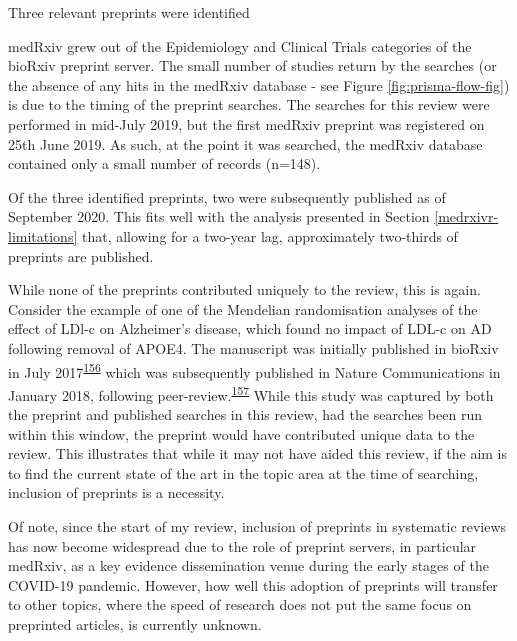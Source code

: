 \documentclass[a4paper, twoside]{templates/ociamthesis}
\begin{document}
Three relevant preprints were identified

medRxiv grew out of the Epidemiology and Clinical Trials categories of the bioRxiv preprint server. The small number of studies return by the searches (or the absence of any hits in the medRxiv database - see Figure \ref{fig:prisma-flow-fig}) is due to the timing of the preprint searches. The searches for this review were performed in mid-July 2019, but the first medRxiv preprint was registered on 25th June 2019. As such, at the point it was searched, the medRxiv database contained only a small number of records (n=148).

Of the three identified preprints, two were subsequently published as of September 2020. This fits well with the analysis presented in Section \ref{medrxivr-limitations} that, allowing for a two-year lag, approximately two-thirds of preprints are published.

While none of the preprints contributed uniquely to the review, this is again. Consider the example of one of the Mendelian randomisation analyses of the effect of LDl-c on Alzheimer's disease, which found no impact of LDL-c on AD following removal of APOE4. The manuscript was initially published in bioRxiv in July 2017\textsuperscript{\protect\hyperlink{ref-zhu2017}{156}} which was subsequently published in Nature Communications in January 2018, following peer-review.\textsuperscript{\protect\hyperlink{ref-zhu2018}{157}} While this study was captured by both the preprint and published searches in this review, had the searches been run within this window, the preprint would have contributed unique data to the review. This illustrates that while it may not have aided this review, if the aim is to find the current state of the art in the topic area at the time of searching, inclusion of preprints is a necessity.

Of note, since the start of my review, inclusion of preprints in systematic reviews has now become widespread due to the role of preprint servers, in particular medRxiv, as a key evidence dissemination venue during the early stages of the COVID-19 pandemic. However, how well this adoption of preprints will transfer to other topics, where the speed of research does not put the same focus on preprinted articles, is currently unknown.
\end{document}
